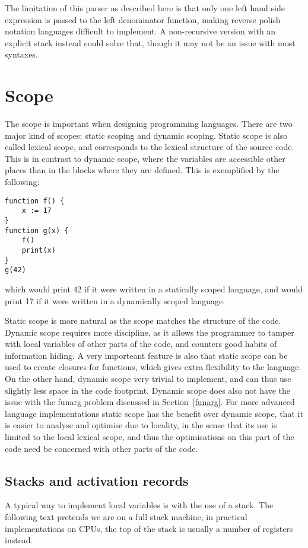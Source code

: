 \documentclass[11pt]{report}
\begin{document}
The limitation of this parser as described here is that only one left hand side expression is passed to the left denominator function, making reverse polish notation languages difficult to implement. A non-recursive version with an explicit stack instead could solve that, though it may not be an issue with most syntaxes. 

\section{Scope}
The scope is important when designing programming languages.
There are two major kind of scopes: static scoping and dynamic scoping.
Static scope is also called lexical scope, and corresponds to the lexical structure of the source code.
This is in contrast to dynamic scope, where the variables are accessible other places than in the blocks where they are defined. This is exemplified by the following:
\begin{verbatim}
function f() {
    x := 17
}
function g(x) {
    f()
    print(x)
}
g(42)
\end{verbatim}
which would print 42 if it were written in a statically scoped language, and would print 17 if it were written in a dynamically scoped language.

Static scope is more natural as the scope matches the structure of the code. Dynamic scope requires more discipline, as it allows the programmer to tamper with local variables of other parts of the code, and counters good habits of information hiding. A very importeant feature is also that static scope can be used to create closures for functions, which gives extra flexibility to the language.
On the other hand, dynamic scope very trivial to implement, and can thus use slightly less space in the code footprint. Dynamic scope does also not have the issue with the funarg problem discussed in Section~\ref{funarg}.
For more advanced language implementations static scope has the benefit over dynamic scope, that it is easier to analyse and optimise due to locality, in the sense that its use is limited to the local lexical scope, and thus the optimisations on this part of the code need be concerned with other parts of the code.

\subsection{Stacks and activation records}
A typical way to implement local variables is with the use of a stack.
The following text pretends we are on a full stack machine, 
in practical implementations on CPUs, the top of the stack is usually a number of registers instead.
\end{document}
